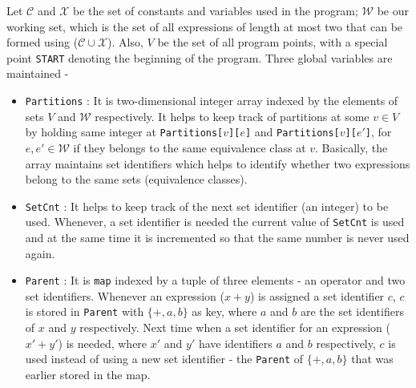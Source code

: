 Let $\mathcal C$ and $\mathcal X$ be the set of constants and variables used in the program;
$\mathcal W$ be our working set, which is the set of all expressions of length at most two 
that can be formed using ($\mathcal C \cup \mathcal X$). Also, $V$ be the set of all program 
points, with a special point \texttt{START} denoting the beginning of the program.
\bigbreak \noindent Three global variables are maintained - 
\begin{itemize} \tightlist
    \item \texttt{Partitions} : It is two-dimensional integer array indexed by the 
                                elements of sets $V$ and $\mathcal W$ respectively. It 
                                helps to keep track of partitions at some $v \in V$ by
                                holding same integer at \texttt{Partitions[$v$][$e$]} and
                                \texttt{Partitions[$v$][$e'$]}, for $e, e' \in \mathcal W$ 
                                if they belongs to the same equivalence class at $v$.
                                Basically, the array maintains set identifiers which helps 
                                to identify whether two expressions belong to the same sets 
                                (equivalence classes).
    \item \texttt{SetCnt} : It helps to keep track of the next set identifier (an integer)
                            to be used. Whenever, a set identifier is needed the current 
                            value of \texttt{SetCnt} is used and at the same time it is 
                            incremented so that the same number is never used again.
    \item \texttt{Parent} : It is \texttt{map} indexed by a tuple of three elements - an   
                            operator and two set identifiers. Whenever an expression 
                            ($x + y$) is assigned a set identifier $c$, $c$ is stored in 
                            \texttt{Parent} with $\{+, a, b\}$ as key, where $a$ and $b$ are 
                            the set identifiers of $x$ and $y$ respectively. Next time 
                            when a set identifier for an expression ($x' + y'$) is needed, 
                            where $x'$ and $y'$ have identifiers $a$ and $b$ respectively, 
                            $c$ is used instead of using a new set identifier - the \texttt
                            {Parent} of $\{+, a, b\}$ that was earlier stored in the map.
\end{itemize}

